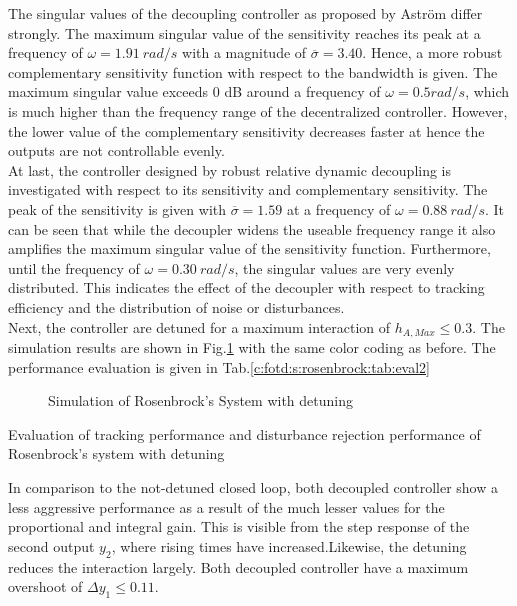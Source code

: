 The singular values of the decoupling controller as proposed by Astr\"om differ strongly. The maximum singular value of the sensitivity reaches its peak at a frequency of $\omega = 1.91 ~rad/s$ with a magnitude of $\overline{\sigma} = 3.40$. Hence, a more robust complementary sensitivity function with respect to the bandwidth is given. The maximum singular value exceeds 0 dB around a frequency of $\omega = 0.5 rad/s$, which is much higher than the frequency range of the decentralized controller. However, the lower value of the complementary sensitivity decreases faster at hence the outputs are not controllable evenly.\\

At last, the controller designed by robust relative dynamic decoupling is investigated with respect to its sensitivity and complementary sensitivity. The peak of the sensitivity is given with $\overline{\sigma} = 1.59$ at a frequency of $\omega = 0.88 ~rad/s$. It can be seen that while the decoupler widens the useable frequency range it also amplifies the maximum singular value of the sensitivity function. Furthermore, until the frequency of $\omega = 0.30 ~rad/s$, the singular values are very evenly distributed. This indicates the effect of the decoupler with respect to tracking efficiency and the distribution of noise or disturbances.\\

Next, the controller are detuned for a maximum interaction of $h_{A,Max} \leq 0.3$. The simulation results are shown in Fig.\ref{c:fotd:s:rosenbrock:f:SimDetuned} with the same color coding as before. The performance evaluation is given in Tab.\ref{c:fotd:s:rosenbrock:tab:eval2}\\

\begin{figure}[H]\centering

\caption{Simulation of Rosenbrock's System with detuning}
\label{c:fotd:s:rosenbrock:f:SimDetuned}
\end{figure}

\begin{table}[H]
\centering
\caption{Evaluation of tracking performance and disturbance rejection performance of Rosenbrock's system with detuning}
\label{c:fotd:s:rosenbrock:tab:eval2}

\end{table}

In comparison to the not-detuned closed loop, both decoupled controller show a less aggressive performance as a result of the much lesser values for the proportional and integral gain. This is visible from the step response of the second output $y_2$, where rising times have increased.Likewise, the detuning reduces the interaction largely. Both decoupled controller have a maximum overshoot of $\Delta y_{1} \leq 0.11$.\\

